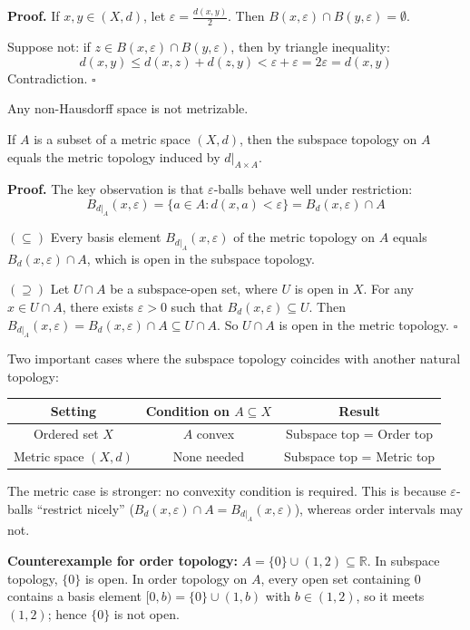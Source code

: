 \documentclass[11pt]{report}
\renewenvironment{proof}[1][Proof]{\noindent\textbf{#1.} }{\hfill$\square$\par\vspace{5pt}}
\begin{document}
\begin{proof}
If $x, y \in (X, d)$, let $\varepsilon = \frac{d(x,y)}{2}$. Then $B(x, \varepsilon) \cap B(y, \varepsilon) = \emptyset$.

Suppose not: if $z \in B(x, \varepsilon) \cap B(y, \varepsilon)$, then by triangle inequality:
\[d(x, y) \leq d(x, z) + d(z, y) < \varepsilon + \varepsilon = 2\varepsilon = d(x,y)\]
Contradiction.
\end{proof}

\begin{corbox}
Any non-Hausdorff space is not metrizable.
\end{corbox}

\begin{thmbox}
If $A$ is a subset of a metric space $(X, d)$, then the subspace topology on $A$ equals the metric topology induced by $d|_{A \times A}$.
\end{thmbox}

\begin{proof}
The key observation is that $\varepsilon$-balls behave well under restriction:
\[B_{d|_A}(x, \varepsilon) = \{a \in A : d(x, a) < \varepsilon\} = B_d(x, \varepsilon) \cap A\]

$(\subseteq)$ Every basis element $B_{d|_A}(x, \varepsilon)$ of the metric topology on $A$ equals $B_d(x, \varepsilon) \cap A$, which is open in the subspace topology.

$(\supseteq)$ Let $U \cap A$ be a subspace-open set, where $U$ is open in $X$. For any $x \in U \cap A$, there exists $\varepsilon > 0$ such that $B_d(x, \varepsilon) \subseteq U$. Then $B_{d|_A}(x, \varepsilon) = B_d(x, \varepsilon) \cap A \subseteq U \cap A$. So $U \cap A$ is open in the metric topology.
\end{proof}

\begin{rembox}
Two important cases where the subspace topology coincides with another natural topology:

\begin{center}
\begin{tabular}{|c|c|c|}
\hline
\textbf{Setting} & \textbf{Condition on $A \subseteq X$} & \textbf{Result} \\
\hline
Ordered set $X$ & $A$ convex & Subspace top = Order top \\
\hline
Metric space $(X, d)$ & None needed & Subspace top = Metric top \\
\hline
\end{tabular}
\end{center}

The metric case is stronger: no convexity condition is required. This is because $\varepsilon$-balls ``restrict nicely'' ($B_d(x,\varepsilon) \cap A = B_{d|_A}(x,\varepsilon)$), whereas order intervals may not.

\textbf{Counterexample for order topology:} $A = \{0\} \cup (1,2) \subseteq \mathbb{R}$. In subspace topology, $\{0\}$ is open. In order topology on $A$, every open set containing $0$ contains a basis element $[0, b) = \{0\} \cup (1, b)$ with $b \in (1,2)$, so it meets $(1,2)$; hence $\{0\}$ is not open.
\end{rembox}
\end{document}
